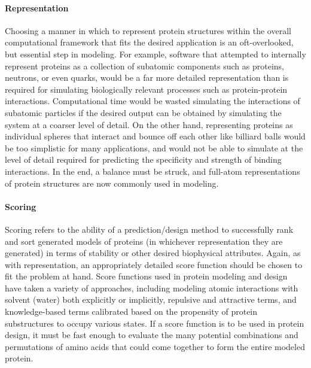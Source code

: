\paragraph{Representation}
Choosing a manner in which to represent protein structures within the overall computational framework that fits the desired application is an oft-overlooked, but essential step in modeling.
For example, software that attempted to internally represent proteins as a collection of subatomic components such as proteins, neutrons, or even quarks, would be a far more detailed representation than is required for simulating biologically relevant processes such as protein-protein interactions.
Computational time would be wasted simulating the interactions of subatomic particles if the desired output can be obtained by simulating the system at a coarser level of detail.
On the other hand, representing proteins as individual spheres that interact and bounce off each other like billiard balls would be too simplistic for many applications, and would not be able to simulate at the level of detail required for predicting the specificity and strength of binding interactions.
In the end, a balance must be struck, and full-atom representations of protein structures are now commonly used in modeling.

\paragraph{Scoring}
Scoring refers to the ability of a prediction/design method to successfully rank and sort generated models of proteins (in whichever representation they are generated) in terms of stability or other desired biophysical attributes.
Again, as with representation, an appropriately detailed score function should be chosen to fit the problem at hand.
Score functions used in protein modeling and design have taken a variety of approaches, including modeling atomic interactions with solvent (water) both explicitly\cite{duan_pointcharge_2003,brooks_charmm:_2009} or implicitly\cite{lazaridis_effective_1999}, repulsive and attractive terms\cite{lennard-jones_determination_1924}, and knowledge-based terms calibrated based on the propensity of protein substructures to occupy various states\cite{rohl_protein_2004}.
If a score function is to be used in protein design, it must be fast enough to evaluate the many potential combinations and permutations of amino acids that could come together to form the entire modeled protein.


